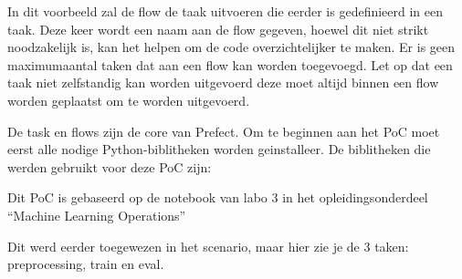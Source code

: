 
In dit voorbeeld zal de flow de taak uitvoeren die eerder is gedefinieerd in een taak. Deze keer wordt een naam aan de flow gegeven, hoewel dit niet strikt noodzakelijk is, kan het helpen om de code overzichtelijker te maken. Er is geen maximumaantal taken dat aan een flow kan worden toegevoegd. Let op dat een taak niet zelfstandig kan worden uitgevoerd deze moet altijd binnen een flow worden geplaatst om te worden uitgevoerd.

De task en flows zijn de core van Prefect. Om te beginnen aan het PoC moet eerst alle nodige Python-biblitheken worden geinstalleer.
De biblitheken die werden gebruikt voor deze PoC zijn:



Dit PoC is gebaseerd op de notebook van labo 3 in het opleidingsonderdeel ``Machine Learning Operations''


Dit werd eerder toegewezen in het scenario, maar hier zie je de 3 taken: preprocessing, train en eval.

